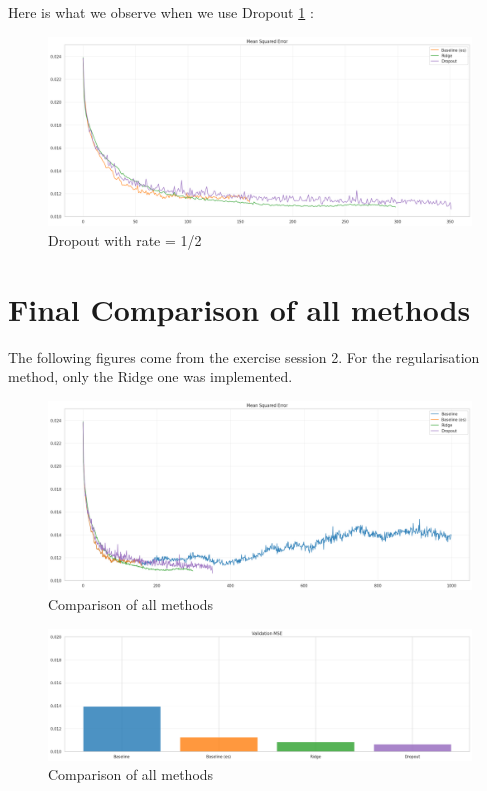 \documentclass[a4paper,12pt]{article}
\begin{document}
Here is what we observe when we use Dropout \ref{fig:dropout} :

\begin{figure}[h!]
    \centering
    \includegraphics[width=1\textwidth]{Dropout.png}
    \caption{Dropout with rate = 1/2}
    \label{fig:dropout}
\end{figure}    

\section{Final Comparison of all methods}

The following figures come from the exercise session 2. For the regularisation method, only the Ridge one was implemented.

\begin{figure}[h!]
    \centering
    \includegraphics[width=1\textwidth]{Comparison1.png}
    \caption{Comparison of all methods}
    \label{fig:comparison}
\end{figure}    

\begin{figure}[h!]
    \centering
    \includegraphics[width=1\textwidth]{Comparison2.png}
    \caption{Comparison of all methods}
    \label{fig:comparison2}
\end{figure}    
\end{document}
